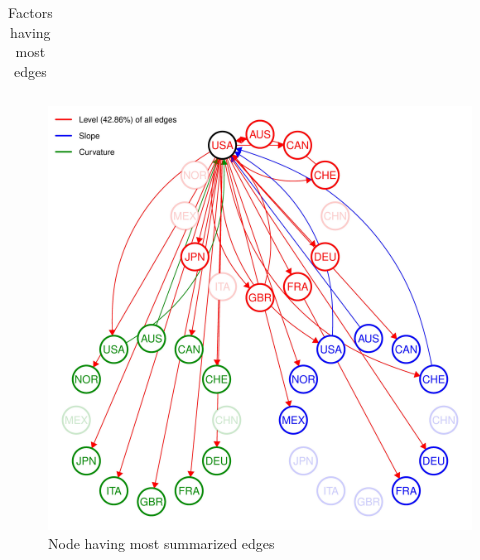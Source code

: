 \documentclass[12pt,bibliography=totoc]{article}
\begin{document}
{\begin{table}[h]
\begin{tabular}{l  lcc  lc lc  lc}
\hline            
\end{tabular}
\label{table:nonlin}%

\caption{Factors having most edges} %

\end{table}





\begin{figure}[H]

\includegraphics[width=13.5cm]{USA_B_1_plot_2004-07-01_2019-12-31_0.01-page-001}
\centering
\caption{Node having most summarized edges}

\end{figure}

\begin{figure}[H]


\end{figure}}
\end{document}
